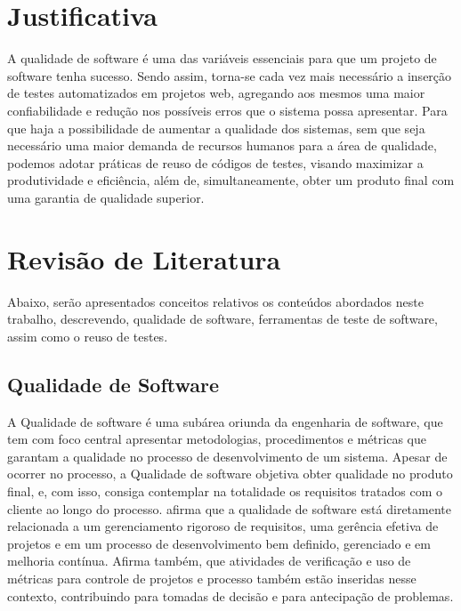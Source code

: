 \documentclass[12pt]{article}
\begin{document}
	\section{Justificativa}
	
	A qualidade de software  é uma das variáveis essenciais para que um projeto de software tenha sucesso.
	Sendo assim, torna-se cada vez mais necessário a inserção de testes automatizados em projetos web,
	agregando aos mesmos uma maior confiabilidade e redução nos possíveis erros que o sistema possa
	apresentar. Para que haja a possibilidade de aumentar a qualidade dos sistemas, sem que seja necessário uma maior
	demanda de recursos humanos para a área de qualidade, podemos adotar práticas de reuso de códigos de testes, visando
	maximizar a produtividade e eficiência, além de, simultaneamente, obter um produto final com uma garantia de qualidade
	superior.
	
	\section{Revisão de Literatura}

	Abaixo, serão apresentados conceitos relativos os conteúdos abordados neste trabalho, descrevendo, qualidade de software, ferramentas de teste de software, assim como o reuso de testes.
	
	\subsection{Qualidade de Software}
	
	A Qualidade de software é uma subárea oriunda da engenharia de software, que tem com foco central apresentar metodologias,
	procedimentos e métricas que garantam a qualidade no processo de desenvolvimento de um sistema. Apesar de ocorrer no processo, a Qualidade de software
	objetiva obter qualidade no produto final, e, com isso, consiga contemplar na totalidade os requisitos tratados com o cliente ao longo do processo.
    \citeauthor{de2006introduccao} \cite{de2006introduccao} afirma que a qualidade de software está diretamente relacionada a um gerenciamento
    rigoroso de requisitos, uma gerência efetiva de projetos e em um processo de desenvolvimento bem definido, gerenciado e em melhoria contínua. Afirma também,
    que atividades de verificação e uso de métricas para controle de projetos e processo também estão inseridas nesse contexto, contribuindo para tomadas de
    decisão e para antecipação de problemas.
\end{document}
